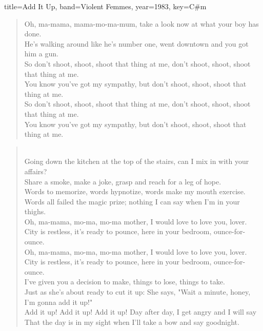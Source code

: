 \documentclass{skrul-leadsheet}
\begin{document}
\begin{song}[transpose-capo=true]{title={Add It Up}, band={Violent Femmes}, year={1983}, key={C#m}}
\begin{verse}
Oh, ma-mama, mama-mo-ma-mum,
take a look now at what your boy has done. \\
He's walking around like he's number one,
went downtown and you got him a gun. \\

So don't shoot, shoot, shoot that thing at me,
don't shoot, shoot, shoot that thing at me. \\
You know you've got my sympathy,
but don't shoot, shoot, shoot that thing at me. \\

So don't shoot, shoot, shoot that thing at me,
don't shoot, shoot, shoot that thing at me. \\
You know you've got my sympathy,
but don't shoot, shoot, shoot that thing at me.
\end{verse}

\begin{interlude}
	
\end{interlude}

\begin{verse}
 \\
Going down the kitchen at the top of the stairs, can I mix in with your affairs? \\
Share a smoke, make a joke, grasp and reach for a leg of hope. \\

Words to memorize, words hypnotize, words make my mouth exercise.  \\
Words all failed the magic prize; nothing I can say when I'm in your thighs. \\

Oh, ma-mama, mo-ma, mo-ma mother, I would love to love you, lover. \\
City is restless, it's ready to pounce, here in your bedroom, ounce-for-ounce. \\

Oh, ma-mama, mo-ma, mo-ma mother, I would love to love you, lover. \\
City is restless, it's ready to pounce, here in your bedroom, ounce-for-ounce. \\

I've given you a decision to make, things to lose, things to take. \\
Just as she's about ready to cut it up:
She says, "Wait a minute, honey, I'm gonna add it up!" \\

Add it up! Add it up! Add it up!
Day after day, I get angry and I will say
That the day is in my sight when I'll take a bow and say goodnight.

\end{verse}

\end{song}
\end{document}
